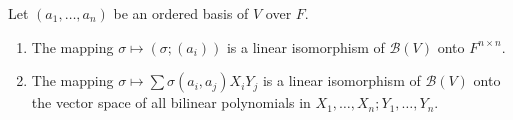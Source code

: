 Let $(a_1, \ldots, a_n)$ be an ordered basis of $V$ over $F$.

\begin{enumerate}
\item The mapping $\sigma \mapsto (\sigma; (a_i))$ is a linear isomorphism of $\mathcal{B}(V)$ onto $F^{n \times n}$.
\item The mapping $\sigma \mapsto \sum \sigma(a_i, a_j) X_i Y_j$ is a linear isomorphism of $\mathcal{B}(V)$ onto the vector space of all bilinear polynomials in $X_1, \ldots, X_n; Y_1, \ldots, Y_n$.
\end{enumerate}
